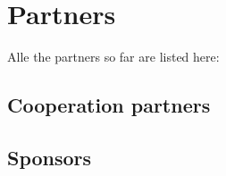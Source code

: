 \appendix
\section{Partners}
Alle the partners so far are listed here:
\subsection{Cooperation partners}
\subsection{Sponsors}
\subsection{}